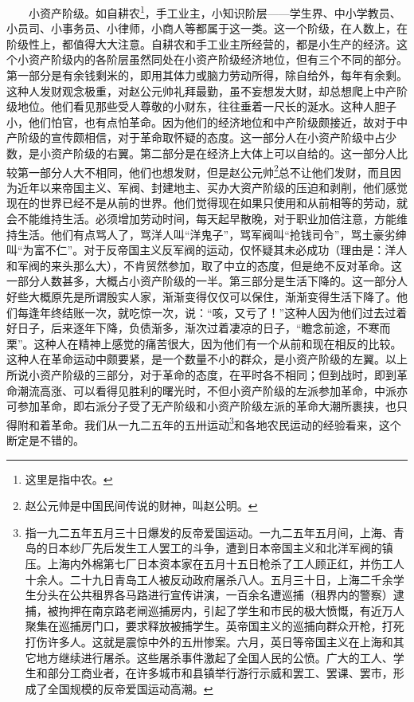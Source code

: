 \documentclass[cn,11pt,chinese]{elegantbook}
\begin{document}
　　小资产阶级。如自耕农\footnote[7]{ 这里是指中农。}，手工业主，小知识阶层——学生界、中小学教员、小员司、小事务员、小律师，小商人等都属于这一类。这一个阶级，在人数上，在阶级性上，都值得大大注意。自耕农和手工业主所经营的，都是小生产的经济。这个小资产阶级内的各阶层虽然同处在小资产阶级经济地位，但有三个不同的部分。第一部分是有余钱剩米的，即用其体力或脑力劳动所得，除自给外，每年有余剩。这种人发财观念极重，对赵公元帅礼拜最勤，虽不妄想发大财，却总想爬上中产阶级地位。他们看见那些受人尊敬的小财东，往往垂着一尺长的涎水。这种人胆子小，他们怕官，也有点怕革命。因为他们的经济地位和中产阶级颇接近，故对于中产阶级的宣传颇相信，对于革命取怀疑的态度。这一部分人在小资产阶级中占少数，是小资产阶级的右翼。第二部分是在经济上大体上可以自给的。这一部分人比较第一部分人大不相同，他们也想发财，但是赵公元帅\footnote[8]{ 赵公元帅是中国民间传说的财神，叫赵公明。}总不让他们发财，而且因为近年以来帝国主义、军阀、封建地主、买办大资产阶级的压迫和剥削，他们感觉现在的世界已经不是从前的世界。他们觉得现在如果只使用和从前相等的劳动，就会不能维持生活。必须增加劳动时间，每天起早散晚，对于职业加倍注意，方能维持生活。他们有点骂人了，骂洋人叫“洋鬼子”，骂军阀叫“抢钱司令”，骂土豪劣绅叫“为富不仁”。对于反帝国主义反军阀的运动，仅怀疑其未必成功（理由是：洋人和军阀的来头那么大），不肯贸然参加，取了中立的态度，但是绝不反对革命。这一部分人数甚多，大概占小资产阶级的一半。第三部分是生活下降的。这一部分人好些大概原先是所谓殷实人家，渐渐变得仅仅可以保住，渐渐变得生活下降了。他们每逢年终结账一次，就吃惊一次，说：“咳，又亏了！”这种人因为他们过去过着好日子，后来逐年下降，负债渐多，渐次过着凄凉的日子，“瞻念前途，不寒而栗”。这种人在精神上感觉的痛苦很大，因为他们有一个从前和现在相反的比较。这种人在革命运动中颇要紧，是一个数量不小的群众，是小资产阶级的左翼。以上所说小资产阶级的三部分，对于革命的态度，在平时各不相同；但到战时，即到革命潮流高涨、可以看得见胜利的曙光时，不但小资产阶级的左派参加革命，中派亦可参加革命，即右派分子受了无产阶级和小资产阶级左派的革命大潮所裹挟，也只得附和着革命。我们从一九二五年的五卅运动\footnote[9]{ 指一九二五年五月三十日爆发的反帝爱国运动。一九二五年五月间，上海、青岛的日本纱厂先后发生工人罢工的斗争，遭到日本帝国主义和北洋军阀的镇压。上海内外棉第七厂日本资本家在五月十五日枪杀了工人顾正红，并伤工人十余人。二十九日青岛工人被反动政府屠杀八人。五月三十日，上海二千余学生分头在公共租界各马路进行宣传讲演，一百余名遭巡捕（租界内的警察）逮捕，被拘押在南京路老闸巡捕房内，引起了学生和市民的极大愤慨，有近万人聚集在巡捕房门口，要求释放被捕学生。英帝国主义的巡捕向群众开枪，打死打伤许多人。这就是震惊中外的五卅惨案。六月，英日等帝国主义在上海和其它地方继续进行屠杀。这些屠杀事件激起了全国人民的公愤。广大的工人、学生和部分工商业者，在许多城市和县镇举行游行示威和罢工、罢课、罢市，形成了全国规模的反帝爱国运动高潮。}和各地农民运动的经验看来，这个断定是不错的。\\
\end{document}
